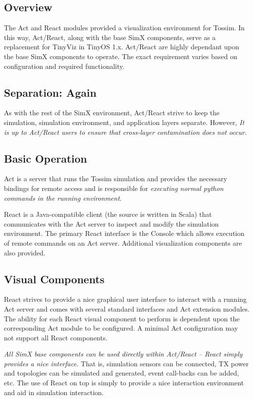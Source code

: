 \subsection{Overview}

The Act and React modules provided a visualization environment for
Tossim.  In this way, Act/React, along with the base SimX components,
serve as a replacement for TinyViz in TinyOS 1.x. Act/React are highly
dependant upon the base SimX components to operate. The exact
requirement varies based on configuration and required functionality.


\subsection{Separation: Again}

As with the rest of the SimX environment, Act/React strive to keep the
simulation, simulation environment, and application layers
separate. However, {\em It is up to Act/React users to ensure that
  cross-layer contamination does not occur.}


\subsection{Basic Operation}

Act is a server that runs the Tossim simulation and provides the
necessary bindings for remote access and is responsible for {\em
  executing normal python commands in the running environment}.

React is a Java-compatible client (the source is written in Scala)
that communicates with the Act server to inspect and modify the
simulation environment. The primary React interface is the Console
which allows execution of remote commands on an Act server. Additional
visualization components are also provided.


\subsection{Visual Components}

React strives to provide a nice graphical user interface to interact
with a running Act server and comes with several standard interfaces
and Act extension modules. The ability for each React visual component
to perform is dependent upon the corresponding Act module to be
configured. A minimal Act configuration may not support all React
components.

{\em All SimX base components can be used directly within Act/React --
  React simply provides a nice interface.} That is, simulation sensors
can be connected, TX power and topologies can be simulated and
generated, event call-backs can be added, etc. The use of React on top
is simply to provide a nice interaction environment and aid in
simulation interaction.


